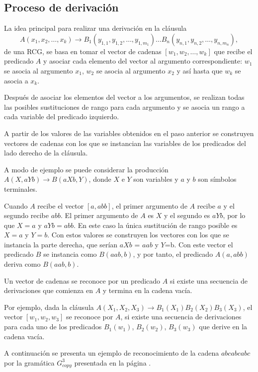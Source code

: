 \documentclass{article}
\begin{document}
\subsection{Proceso de derivación}

La idea principal para realizar una derivación en la cláusula
\[
    A(x_1, x_2, \ldots, x_k) \to B_1(y_{1,1}, y_{1,2}, \ldots, y_{1,m_1}) \ldots B_n(y_{n,1}, y_{n,2}, \ldots, y_{n,m_n}),
\]
de una RCG, se basa en tomar el vector de cadenas $[w_1, w_2,\ldots, w_k]$ que recibe el predicado $A$ y asociar cada elemento del vector al argumento
correspondiente: $w_1$ se asocia al argumento $x_1$, $w_2$ se asocia al argumento $x_2$ y así hasta que
$w_k$ se asocia a $x_k$.

Después de asociar los elementos del vector a los argumentos, se realizan todas las posibles sustituciones de rango para cada argumento y se asocia un rango a
cada variable del predicado izquierdo.

A partir de los valores de las variables obtenidos en el paso anterior se construyen vectores de cadenas con los que se
instancian las variables de los predicados del lado derecho de la cláusula.

A modo de ejemplo se puede considerar la producción $A(X,aYb)\to B(aXb,Y)$, donde $X$ e $Y$ son variables y $a$ y $b$ son símbolos terminales.

Cuando $A$ recibe el vector $[a,abb]$, el primer argumento de $A$ recibe $a$ y el segundo recibe $abb$.  El primer argumento de $A$ es $X$ y el segundo es $aYb$, por lo que $X=a$ y $aYb=abb$. En este caso la única sustitución de rango posible es $X=a$ y $Y=b$. Con estos valores se construyen los vectores con los que se instancia la parte derecha, que serían $aXb$ = $aab$ y $Y$=b. Con este vector el predicado $B$ se instancia como $B(aab,b)$, y por tanto, el predicado $A(a,abb)$ deriva como $B(aab,b)$.


Un vector de cadenas se reconoce por un predicado $A$ si existe una secuencia de derivaciones que comienza en $A$ y termina en la cadena vacía.

Por ejemplo, dada la cláusula $A(X_1,X_2,X_3)\to B_1(X_1)B_2(X_2)B_3(X_3)$, el vector $[w_1,w_2,w_3]$ se reconoce por $A$, si existe una secuencia de derivaciones para cada uno de los predicados $B_1(w_1)$, $B_2(w_2)$, $B_3(w_3)$ que derive en la cadena vacía.

A continuación se presenta un ejemplo de reconocimiento de la cadena $abcabcabc$ por la gramática $G^3_{copy}$
presentada en la página \pageref{g_3copy}.
\end{document}
